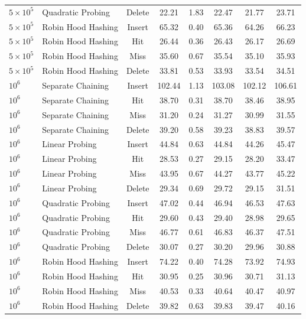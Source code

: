\documentclass[conference]{IEEEtran}
\begin{document}
\begin{table}[t]
\begin{tabular}{llcccccc}
$5 \times 10^5$ & Quadratic Probing & Delete & 22.21 & 1.83 & 22.47 & 21.77 & 23.71 \\
$5 \times 10^5$ & Robin Hood Hashing & Insert & 65.32 & 0.40 & 65.36 & 64.26 & 66.23 \\
$5 \times 10^5$ & Robin Hood Hashing & Hit & 26.44 & 0.36 & 26.43 & 26.17 & 26.69 \\
$5 \times 10^5$ & Robin Hood Hashing & Miss & 35.60 & 0.67 & 35.54 & 35.10 & 35.93 \\
$5 \times 10^5$ & Robin Hood Hashing & Delete & 33.81 & 0.53 & 33.93 & 33.54 & 34.51 \\
\midrule
$10^6$ & Separate Chaining & Insert & 102.44 & 1.13 & 103.08 & 102.12 & 106.61 \\
$10^6$ & Separate Chaining & Hit & 38.70 & 0.31 & 38.70 & 38.46 & 38.95 \\
$10^6$ & Separate Chaining & Miss & 31.20 & 0.24 & 31.27 & 30.99 & 31.55 \\
$10^6$ & Separate Chaining & Delete & 39.20 & 0.58 & 39.23 & 38.83 & 39.57 \\
$10^6$ & Linear Probing & Insert & 44.84 & 0.63 & 44.84 & 44.26 & 45.47 \\
$10^6$ & Linear Probing & Hit & 28.53 & 0.27 & 29.15 & 28.20 & 33.47 \\
$10^6$ & Linear Probing & Miss & 43.95 & 0.67 & 44.27 & 43.77 & 45.22 \\
$10^6$ & Linear Probing & Delete & 29.34 & 0.69 & 29.72 & 29.15 & 31.51 \\
$10^6$ & Quadratic Probing & Insert & 47.02 & 0.44 & 46.94 & 46.53 & 47.63 \\
$10^6$ & Quadratic Probing & Hit & 29.60 & 0.43 & 29.40 & 28.98 & 29.65 \\
$10^6$ & Quadratic Probing & Miss & 46.77 & 0.61 & 46.83 & 46.37 & 47.51 \\
$10^6$ & Quadratic Probing & Delete & 30.07 & 0.27 & 30.20 & 29.96 & 30.88 \\
$10^6$ & Robin Hood Hashing & Insert & 74.22 & 0.40 & 74.28 & 73.92 & 74.93 \\
$10^6$ & Robin Hood Hashing & Hit & 30.95 & 0.25 & 30.96 & 30.71 & 31.13 \\
$10^6$ & Robin Hood Hashing & Miss & 40.53 & 0.33 & 40.64 & 40.47 & 40.97 \\
$10^6$ & Robin Hood Hashing & Delete & 39.82 & 0.63 & 39.83 & 39.47 & 40.16 \\
\midrule
\bottomrule
\end{tabular}
\end{table}
\end{document}
